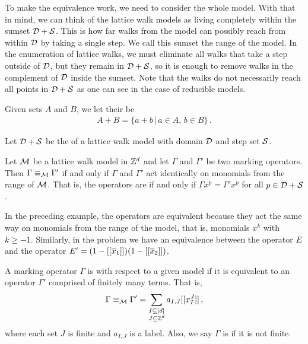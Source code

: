 To make the equivalence work, we need to consider the whole model. With that in mind, we can think of the lattice walk models as living completely within the sumset $\mathcal{D} + \mathcal{S}$. This is how far walks from the model can possibly reach from within $\mathcal{D} $ by taking a single step. We call this sumset the range of the model. In the enumeration of lattice walks, we must eliminate all walks that take a step outside of $\mathcal{D}$, but they remain in $\mathcal{D} + \mathcal{S}$, so it is enough to remove walks in the complement of $\mathcal{D}$ inside the sumset. Note that the walks do not necessarily reach all points in $\mathcal{D} + \mathcal{S}$ as one can see in the case of reducible models.
\begin{defn} Given sets $A$ and $B$, we let their  be
\begin{align}
	A + B = \{a + b\,|\,a\in A,\, b\in B\}\,.
\end{align}
\end{defn}
\begin{defn} Let $\mathcal{D} + \mathcal{S}$ be the  of a lattice walk model with domain $\mathcal{D} $ and step set $\mathcal{S} $.
\end{defn}
\begin{defn} Let $\mathcal{M}$ be a lattice walk model in $\mathbb{Z}^d$ and let $\Gamma$ and $\Gamma'$ be two marking operators. Then $\Gamma \equiv_{\mathcal{M}} \Gamma'$ if and only if $\Gamma$ and $\Gamma'$ act identically on monomials from the range of $\mathcal{M}$. That is, the operators are  if and only if $\Gamma  x^p = \Gamma' x^p$ for all $p\in \mathcal{D} + \mathcal{S} $.
\end{defn}
In the preceding example, the operators are equivalent because they act the same way on monomials from the range of the model, that is, monomials $x^k$ with $k \ge -1$. Similarly, in the \twoD problem we have an equivalence between the operator $E$ and the operator $E' = (1-[[\overline{x}_1]])(1-[[\overline{x}_2]])$.

\begin{defn} A marking operator $\Gamma$ is  with respect to a given model if it is equivalent to an operator $\Gamma'$ comprised of finitely many terms. That is,
\begin{align}
	\Gamma \equiv_{\mathcal{M}} \Gamma' = \sum_{\substack{I\subseteq [d]\\ J \subseteq \mathbb{Z}^d}}a_{I,J} [[x_I^J]]\,,
\end{align}
where each set $J$ is finite and $a_{I,J}$ is a label. Also, we say $\Gamma$ is  if it is not finite.
\end{defn}

